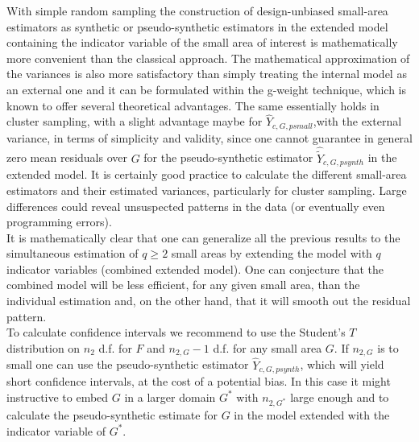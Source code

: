 \documentclass[a4paper,12pt,leqno, titlepage]{article}
\begin{document}
With simple random sampling the construction of design-unbiased small-area estimators as synthetic or pseudo-synthetic estimators in the extended model containing the indicator variable of the small area of interest is mathematically more convenient than the classical approach. The mathematical approximation of the variances is also more satisfactory than simply treating the internal model as an external one and it can be formulated within the g-weight technique, which is known to offer several theoretical advantages. The same essentially holds in cluster sampling, with a slight advantage maybe for $\hat{Y}_{c,G,psmall}$,with the external variance, in terms of simplicity and validity, since one cannot guarantee in general zero mean residuals over $G$ for the pseudo-synthetic estimator $\hat{\tilde{Y}}_{c,G,psynth}$ in the extended model. It is certainly good practice to calculate the different small-area estimators and their estimated variances, particularly for cluster sampling. Large differences could reveal unsuspected patterns in the data (or eventually even programming errors).\\
It is mathematically clear that one can generalize all the previous results to the simultaneous estimation of $q \ge 2$ small areas by extending the model with $q$ indicator variables (combined extended model). One can conjecture that the combined model will be less efficient, for any given small area, than the individual estimation and, on the other hand, that it will smooth out the residual pattern.\\
To calculate confidence intervals we recommend to use the Student's $T$ distribution on $ n_2$ d.f. for $F$ and $n_{2,G}-1$ d.f. for any small area $G$. If $n_{2,G}$ is to small one can use the pseudo-synthetic estimator $\hat{Y}_{c,G,psynth}$, which will yield short confidence intervals, at the cost of a potential bias. In this case it might instructive to embed $G$ in a larger domain $G^*$ with $n_{2,G^*}$ large enough and to calculate the pseudo-synthetic estimate for $G$ in the model extended with the indicator variable of $G^*$.
\newpage
\end{document}
